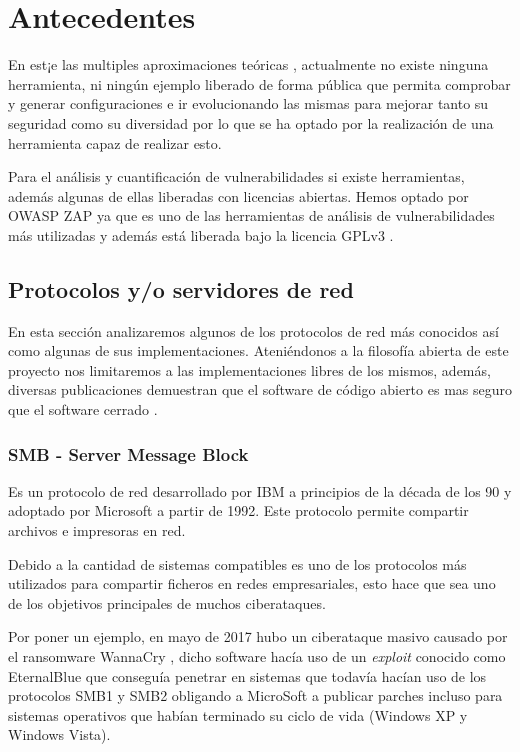 \chapter{Antecedentes}

En est¡e las multiples aproximaciones teóricas \cite{schlenker_deceiving_2018} \cite{champagne_genetic_2018}, actualmente no existe ninguna herramienta, ni ningún ejemplo liberado de forma pública que permita comprobar y generar configuraciones e ir evolucionando las mismas para mejorar tanto su seguridad como su diversidad por lo que se ha optado por la realización de una herramienta capaz de realizar esto.

\big
Para el análisis y cuantificación de vulnerabilidades si existe herramientas, además algunas de ellas liberadas con licencias abiertas. Hemos optado por OWASP ZAP ya que es uno de las herramientas de análisis de vulnerabilidades más utilizadas y además está liberada bajo la licencia GPLv3 \cite{free_software_foundation_gnu_2007}.

\section {Protocolos y/o servidores de red}

En esta sección analizaremos algunos de los protocolos de red más conocidos así como algunas de sus implementaciones. Ateniéndonos a la filosofía abierta de este proyecto nos limitaremos a las implementaciones libres de los mismos, además, diversas publicaciones demuestran que el software de código abierto es mas seguro que el software cerrado \cite{walia_comparative_2006} \cite{mansfield-devine_open_2008} \cite{clark_is_2009}.

\subsection {SMB - Server Message Block}

Es un protocolo de red desarrollado por IBM a principios de la década de los 90 y adoptado por Microsoft a partir de 1992. Este protocolo permite compartir archivos e impresoras en red.

\bigskip
Debido a la cantidad de sistemas compatibles es uno de los protocolos más utilizados para compartir ficheros en redes empresariales, esto hace que sea uno de los objetivos principales de muchos ciberataques.

\bigskip
Por poner un ejemplo, en mayo de 2017 hubo un ciberataque masivo causado por el ransomware WannaCry \cite{sarabia_mayor_2017}, dicho software hacía uso de un \textit{exploit} conocido como EternalBlue que conseguía penetrar en sistemas que todavía hacían uso de los protocolos SMB1 y SMB2 obligando a MicroSoft a publicar parches incluso para sistemas operativos que habían terminado su ciclo de vida (Windows XP y Windows Vista).


